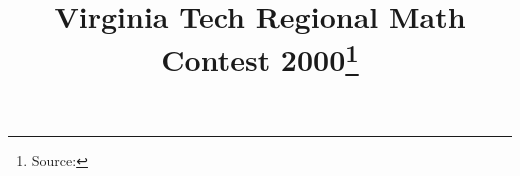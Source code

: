\documentclass[10pt]{article}
\begin{document}
\title{Virginia Tech Regional Math Contest 2000\footnote{Source: \source}}
\author{\vspace{-2ex}}
\date{\vspace{-6ex}} %
\maketitle







\end{document}
